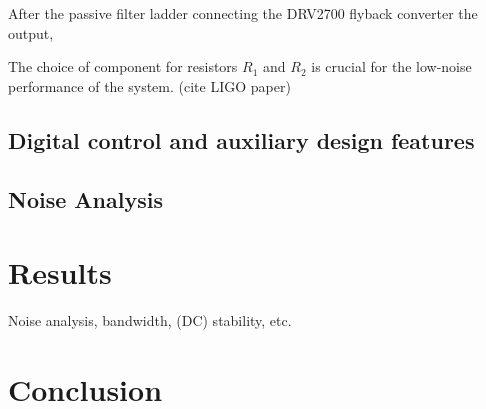 \documentclass[aip,rsi,reprint]{revtex4-1} %
\begin{document}
After the passive filter ladder connecting the DRV2700 flyback converter the output,

The choice of component for resistors $R_1$ and $R_2$ is crucial for the low-noise performance of the system. (cite LIGO paper)

\subsection{Digital control and auxiliary design features}
\label{Sec:DigControlAuxDesign}

\subsection{Noise Analysis}
\label{Sec:NoiseAnalysis}

\section{Results}
\label{Sec:Results}
Noise analysis, bandwidth, (DC) stability, etc.


\section{Conclusion}
\label{Sec:Conclusion}



%
%
\end{document}
